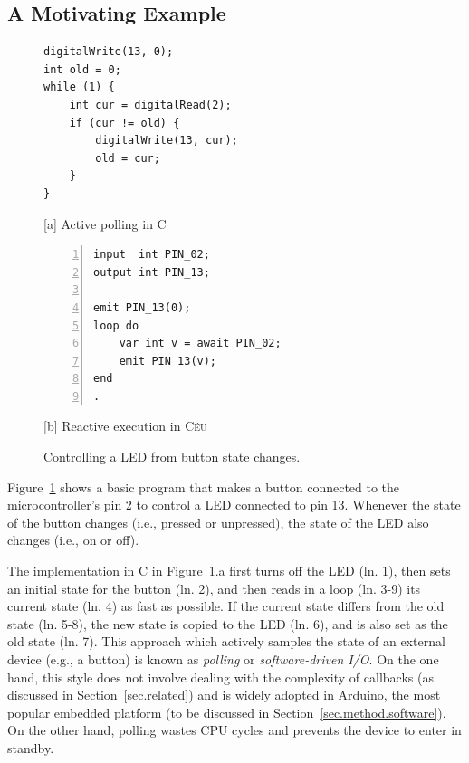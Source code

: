 \documentclass[12pt,english]{amsart}
\newcommand{\CEU}{\textsc{C\'{e}u}\xspace}
\begin{document}
\subsection{A Motivating Example}

{\linespread{1}
\begin{figure}[t]
\begin{minipage}[t]{0.50\linewidth}
\begin{lstlisting}[xrightmargin=1cm]
digitalWrite(13, 0);
int old = 0;
while (1) {
    int cur = digitalRead(2);
    if (cur != old) {
        digitalWrite(13, cur);
        old = cur;
    }
}

\end{lstlisting}
\centering\small{[a] Active polling in C}
\end{minipage}
%
\begin{minipage}[t]{0.45\linewidth}
\begin{lstlisting}[numbers=left]
input  int PIN_02;
output int PIN_13;

emit PIN_13(0);
loop do
    var int v = await PIN_02;
    emit PIN_13(v);
end
.
\end{lstlisting}
\centering\small{[b] Reactive execution in \CEU}
\end{minipage}
\caption{ Controlling a LED from button state changes.
\label{lst.basic}
}
\end{figure}
}

Figure~\ref{lst.basic} shows a basic program that makes a button connected
to the microcontroller's pin 2 to control a LED connected to pin 13.
Whenever the state of the button changes (i.e., pressed or unpressed), the
state of the LED also changes (i.e., on or off).

The implementation in C in Figure~\ref{lst.basic}.a first turns off the LED
(ln. 1), then sets an initial state for the button (ln. 2), and then reads in a
loop (ln. 3-9) its current state (ln. 4) as fast as possible.
If the current state differs from the old state (ln. 5-8), the new state is
copied to the LED (ln. 6), and is also set as the old state (ln. 7).
%
This approach which actively samples the state of an external device (e.g., a
button) is known as \emph{polling} or \emph{software-driven I/O}.
%
On the one hand, this style does not involve dealing with the complexity of
callbacks (as discussed in Section~\ref{sec.related}) and is widely adopted in
Arduino, the most popular embedded platform (to be discussed in
Section~\ref{sec.method.software}).
On the other hand, polling wastes CPU cycles and prevents the device to enter in
standby.
\end{document}
